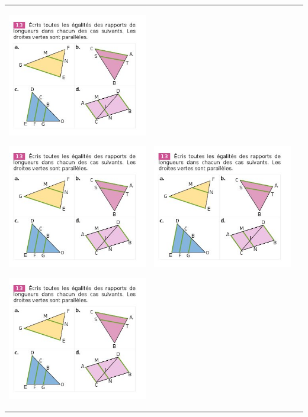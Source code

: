 \documentclass[12pt, twoside]{article}
\begin{document}
\pagebreak


\begin{landscape}
\begin{tabular}{ccc}
\begin{minipage}{8cm}
\includegraphics[width=7cm]{images/ex13.jpg}


\enskip

\includegraphics[width=7cm]{images/ex13.jpg}

\enskip

\includegraphics[width=7cm]{images/ex13.jpg}
\end{minipage}
&
\begin{minipage}{8cm}
\includegraphics[width=7cm]{images/ex13.jpg}



\end{minipage}
\end{tabular}
\end{landscape}
\end{document}
